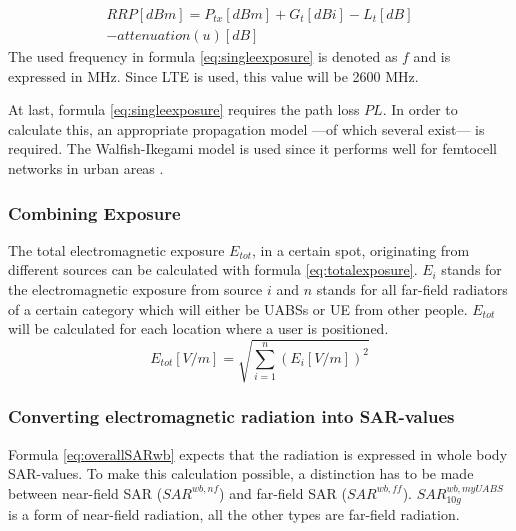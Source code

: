 \documentclass[twocolumn]{phdsymp} %
\begin{document}
\begin{equation}
\begin{aligned}
RRP [dBm] = P_{tx} [dBm] + G_t [dBi]- L_t [dB]\\
     - attenuation(u) [dB]
\end{aligned}
\label{eq:eirp}
\end{equation}
The used frequency in formula \ref{eq:singleexposure} is denoted as $f$ and is expressed in MHz. Since \gls{LTE} is used, this value will be 2600 MHz.

At last, formula \ref{eq:singleexposure} requires the path loss $PL$. In order to calculate this, an appropriate propagation model ---of which several exist--- is required.
The Walfish-Ikegami model is used since it performs well for femtocell networks in urban areas \cite{J2}. %

\subsubsection{Combining Exposure}
The total electromagnetic exposure $E_{tot}$, in a certain spot, originating from different sources can be calculated with formula \ref{eq:totalexposure}. $E_i$ stands for 
the electromagnetic exposure from source $i$ and
$n$ stands for all far-field radiators of a certain category which will either be UABSs or UE from other people.
$E_{tot}$ will be calculated for each location where a user is positioned.  
\begin{equation}
E_{tot} [V/m] = \sqrt{\sum_{i=1}^{n} (E_i [V/m]) ^2}
\label{eq:totalexposure}
\end{equation}

\subsubsection{Converting electromagnetic radiation into SAR-values}

Formula \ref{eq:overallSARwb} expects that the radiation is expressed in whole body \gls{SAR}-values.
To make this calculation possible, a distinction has to be made between near-field \gls{SAR}
($SAR^{wb,nf}$) and far-field \gls{SAR} ($SAR^{wb,ff}$). $SAR^{wb,myUABS}_{10g}$ is a form of near-field radiation, 
all the other types are far-field radiation.
\end{document}

